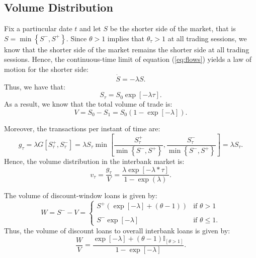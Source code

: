

\subsection{Volume Distribution}

{ Fix a partiucular date $t$ and let $S$ be the shorter
side of the market, that is $S=\min\left\{ S^{-},S^{+}\right\} $.
Since $\theta>1$ implies that $\theta_{\tau}>1$ at all trading sessions,
we know that the shorter side of the market remains the shorter side
at all trading sessions. Hence, the continuous-time limit of equation
(\ref{eq:flows}) yields a law of motion for the shorter side:
\[
\dot{S}=-\lambda S.
\]
Thus, we have that:
\[
S_{\tau}=S_{0}\exp\left[-\lambda\tau\right].
\]
As a result, we know that the total volume of trade is:
\[
V=S_{0}-S_{1}=S_{0}(1-\exp\left[-\lambda\right]).
\]
}

{ Moreover, the transactions per instant of time are:
\[
g_{\tau}=\lambda G\left[S_{\tau}^{+},S_{\tau}^{-}\right]=\lambda S_{\tau}\min\left[\frac{S_{\tau}^{+}}{\min\left\{ S^{-},S^{+}\right\} },\frac{S_{\tau}^{-}}{\min\left\{ S^{-},S^{+}\right\} }\right]=\lambda S_{\tau}.
\]
Hence, the volume distribution in the interbank market is:
\[
v_{\tau}=\frac{g_{\tau}}{V}=\frac{\lambda\exp\left[-\lambda*\tau\right]}{1-\exp\left(\lambda\right)}.
\]
}

{ The volume of discount-window loans is given by:
\[
W=S^{-}-V=\begin{cases}
S^{+}\left(\exp\left[-\lambda\right]+\left(\theta-1\right)\right) & \text{if }\theta>1\\
\\S^{-}\exp\left[-\lambda\right] & \text{if }\theta\leq1.
\end{cases}
\]
Thus, the volume of discount loans to overall interbank loans is given
by:
\[
\frac{W}{V}=\frac{\exp\left[-\lambda\right]+\left(\theta-1\right)\mathbb{I}_{\left[\theta>1\right]}}{1-\exp\left[-\lambda\right]}.
\]
}

